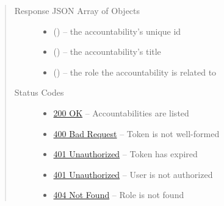 \documentclass[letterpaper,10pt,english]{sphinxmanual}
\begin{document}
\begin{fulllineitems}
\begin{quote}
\begin{description}
\begin{itemize}
\end{itemize}

\item[{Response JSON Array of Objects}] \leavevmode\begin{itemize}
\item {} 
 () -- the accountability's unique id

\item {} 
 () -- the accountability's title

\item {} 
 () -- the role the accountability is related to

\end{itemize}

\item[{Status Codes}] \leavevmode\begin{itemize}
\item {} 
\href{http://www.w3.org/Protocols/rfc2616/rfc2616-sec10.html\#sec10.2.1}{200 OK} -- Accountabilities are listed

\item {} 
\href{http://www.w3.org/Protocols/rfc2616/rfc2616-sec10.html\#sec10.4.1}{400 Bad Request} -- Token is not well-formed

\item {} 
\href{http://www.w3.org/Protocols/rfc2616/rfc2616-sec10.html\#sec10.4.2}{401 Unauthorized} -- Token has expired

\item {} 
\href{http://www.w3.org/Protocols/rfc2616/rfc2616-sec10.html\#sec10.4.2}{401 Unauthorized} -- User is not authorized

\item {} 
\href{http://www.w3.org/Protocols/rfc2616/rfc2616-sec10.html\#sec10.4.5}{404 Not Found} -- Role is not found

\end{itemize}

\end{description}\end{quote}

\end{fulllineitems}
\end{document}
